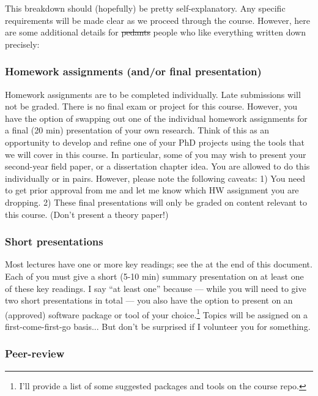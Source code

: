 \documentclass[12]{article}
\begin{document}
This breakdown should (hopefully) be pretty self-explanatory. Any specific requirements will be made clear as we proceed through the course. However, here are some additional details for \sout{pedants} people who like everything written down precisely:

\vspace{-0.25cm}
\subsubsection*{Homework assignments (and/or final presentation)}

Homework assignments are to be completed individually. Late submissions will not be graded. There is no final exam or project for this course. However, you have the option of swapping out one of the individual homework assignments for a final (20 min) presentation of your own research. Think of this as an opportunity to develop and refine one of your PhD projects using the tools that we will cover in this course. In particular, some of you may wish to present your second-year field paper, or a dissertation chapter idea. You are allowed to do this individually or in pairs. However, please note the following caveats: 1) You need to get prior approval from me and let me know which HW assignment you are dropping. 2) These final presentations will only be graded on content relevant to this course. (Don't present a theory paper!)

\vspace{-0.25cm}
\subsubsection*{Short presentations}

Most lectures have one or more key readings; see the  at the end of this document. Each of you must give a short (5-10 min) summary presentation on at least one of these key readings. I say ``at least one'' because --- while you will need to give two short presentations in total --- you also have the option to present on an (approved) software package or tool of your choice.\footnote{I'll provide a list of some suggested packages and tools on the course repo.} Topics will be assigned on a first-come-first-go basis... But don't be surprised if I volunteer you for something.

\vspace{-0.25cm}
\subsubsection*{Peer-review}
\end{document}
